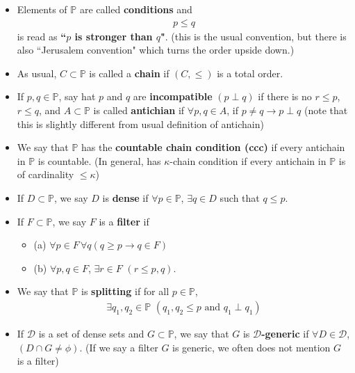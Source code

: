 \documentclass[12pt,a4paper]{article}
\renewenvironment{i}
{\begin{itemize} 
	}%
	{\end{itemize}
}
\begin{document}
\begin{i}
\item Elements of $\mathbb{P}$ are called \textbf{conditions} and
\begin{align*}
p \leq q
\end{align*}
is read as \textbf{``$p$ is stronger than $q$"}. (this is the usual convention, but there is also ``Jerusalem convention" which turns the order upside down.)

\item As usual, $C\subset \mathbb{P}$ is called a \textbf{chain} if $(C, \leq)$ is a total order.

\item If $p, q \in \mathbb{P}$, say hat $p$ and $q$ are \textbf{incompatible} $(p\perp q)$ if there is no $r\leq p$, $r\leq q$, and $A\subset \mathbb{P}$ is called \textbf{antichian} if $\forall p,q \in A$, if $p\neq q \rightarrow p\perp q$ (note that this is slightly different from usual definition of antichain)

\item We say that $\mathbb{P}$ has the \textbf{countable chain condition (ccc)} if every antichain in $\mathbb{P}$ is countable. (In general, has $\kappa$-chain condition if every antichain in $\mathbb{P}$ is of cardinality $\leq\kappa$)

\item If $D\subset \mathbb{P}$, we say $D$ is \textbf{dense} if $\forall p\in \mathbb{P}$, $\exists q\in D$ such that $q\leq p$.

\item If $F\subset \mathbb{P}$, we say $F$ is a \textbf{filter} if 
\begin{i}
\item[(a)] $\forall p\in F \, \forall q (q\geq p \rightarrow q\in F)$
\item[(b)] $\forall p,q\in F$, $\exists r\in F$ $(r\leq p,q)$.
\end{i}
\item We say that $\mathbb{P}$ is \textbf{splitting} if for all $p\in\mathbb{P}$,
\begin{align*}
\exists q_1, q_2 \in \mathbb{P}\,\, (q_1,q_2\leq p \text{ and } q_1 \perp q_1)
\end{align*}
\item If $\mathscr{D}$ is a set of dense sets and $G\subset \mathbb{P}$, we say that $G$ is \textbf{$\mathscr{D}$-generic} if $\forall D\in \mathscr{D}$, $(D\cap G \neq \phi)$. (If we say a filter $G$ is generic, we often does not mention $G$ is a filter)
\end{i}
\s
\end{document}
